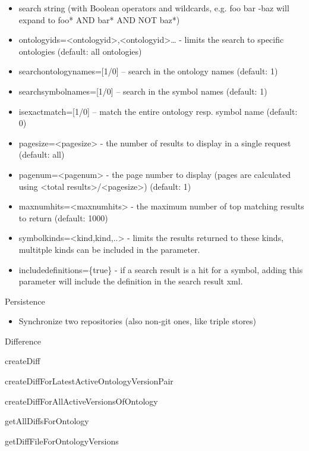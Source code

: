 \documentclass{article}
\begin{document}
\begin{itemize}
\item search string (with Boolean operators and wildcards, e.g.
{\textquotedbl}foo bar -baz{\textquotedbl} will expand to
{\textquotedbl}foo* AND bar* AND NOT baz*{\textquotedbl})
\item
ontologyids={\textless}ontologyid{\textgreater},{\textless}ontologyid{\textgreater}…
- limits the search to specific ontologies (default: all ontologies)
\item searchontologynames=[1/0] – search in the ontology names (default:
1)
\item searchsymbolnames=[1/0] – search in the symbol names (default: 1)
\item isexactmatch=[1/0] – match the entire ontology resp. symbol name
(default: 0)
\item pagesize={\textless}pagesize{\textgreater} - the number of results
to display in a single request (default: all)
\item pagenum={\textless}pagenum{\textgreater} - the page number to
display (pages are calculated using {\textless}total
results{\textgreater}/{\textless}pagesize{\textgreater}) (default: 1)
\item maxnumhits={\textless}maxnumhits{\textgreater} - the maximum
number of top matching results to return (default: 1000)
\item symbolkinds={\textless}kind,kind,..{\textgreater} - limits the
results returned to these kinds, multitple kinds can be included in the
parameter.
\item includedefinitions=\{true\} - if a search result is a hit for a
symbol, adding this parameter will include the definition in the search
result xml.
\end{itemize}

\bigskip

Persistence

\begin{itemize}
\item Synchronize two repositories (also non-git ones, like triple
stores)
\end{itemize}
Difference

createDiff

createDiffForLatestActiveOntologyVersionPair

createDiffForAllActiveVersionsOfOntology

getAllDiffsForOntology

getDiffFileForOntologyVersions
\end{document}

